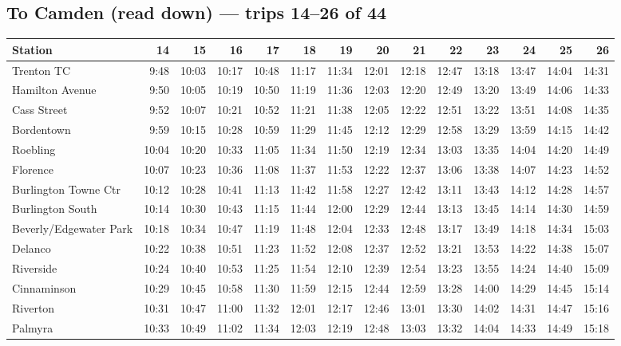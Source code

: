 \subsection*{To Camden (read down) --- trips 14--26 of 44}
\begin{center}\footnotesize\setlength{\tabcolsep}{3pt}\begin{tabular}{@{}lrrrrrrrrrrrrr@{}}\toprule
Station & 14 & 15 & 16 & 17 & 18 & 19 & 20 & 21 & 22 & 23 & 24 & 25 & 26 \\\midrule
Trenton TC & 9:48 & 10:03 & 10:17 & 10:48 & 11:17 & 11:34 & 12:01 & 12:18 & 12:47 & 13:18 & 13:47 & 14:04 & 14:31 \\
Hamilton Avenue & 9:50 & 10:05 & 10:19 & 10:50 & 11:19 & 11:36 & 12:03 & 12:20 & 12:49 & 13:20 & 13:49 & 14:06 & 14:33 \\
Cass Street & 9:52 & 10:07 & 10:21 & 10:52 & 11:21 & 11:38 & 12:05 & 12:22 & 12:51 & 13:22 & 13:51 & 14:08 & 14:35 \\
Bordentown & 9:59 & 10:15 & 10:28 & 10:59 & 11:29 & 11:45 & 12:12 & 12:29 & 12:58 & 13:29 & 13:59 & 14:15 & 14:42 \\
Roebling & 10:04 & 10:20 & 10:33 & 11:05 & 11:34 & 11:50 & 12:19 & 12:34 & 13:03 & 13:35 & 14:04 & 14:20 & 14:49 \\
Florence & 10:07 & 10:23 & 10:36 & 11:08 & 11:37 & 11:53 & 12:22 & 12:37 & 13:06 & 13:38 & 14:07 & 14:23 & 14:52 \\
Burlington Towne Ctr & 10:12 & 10:28 & 10:41 & 11:13 & 11:42 & 11:58 & 12:27 & 12:42 & 13:11 & 13:43 & 14:12 & 14:28 & 14:57 \\
Burlington South & 10:14 & 10:30 & 10:43 & 11:15 & 11:44 & 12:00 & 12:29 & 12:44 & 13:13 & 13:45 & 14:14 & 14:30 & 14:59 \\
Beverly/Edgewater Park & 10:18 & 10:34 & 10:47 & 11:19 & 11:48 & 12:04 & 12:33 & 12:48 & 13:17 & 13:49 & 14:18 & 14:34 & 15:03 \\
Delanco & 10:22 & 10:38 & 10:51 & 11:23 & 11:52 & 12:08 & 12:37 & 12:52 & 13:21 & 13:53 & 14:22 & 14:38 & 15:07 \\
Riverside & 10:24 & 10:40 & 10:53 & 11:25 & 11:54 & 12:10 & 12:39 & 12:54 & 13:23 & 13:55 & 14:24 & 14:40 & 15:09 \\
Cinnaminson & 10:29 & 10:45 & 10:58 & 11:30 & 11:59 & 12:15 & 12:44 & 12:59 & 13:28 & 14:00 & 14:29 & 14:45 & 15:14 \\
Riverton & 10:31 & 10:47 & 11:00 & 11:32 & 12:01 & 12:17 & 12:46 & 13:01 & 13:30 & 14:02 & 14:31 & 14:47 & 15:16 \\
Palmyra & 10:33 & 10:49 & 11:02 & 11:34 & 12:03 & 12:19 & 12:48 & 13:03 & 13:32 & 14:04 & 14:33 & 14:49 & 15:18 \\

\end{tabular}
\end{center}
